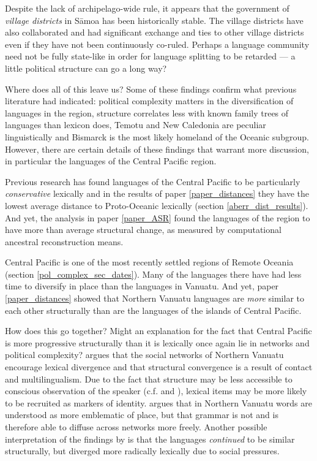 \documentclass[draft,10pt]{article} %
\begin{document}
Despite the lack of archipelago-wide rule, it appears that the government of \emph{village districts} in S\={a}moa has been historically stable. The village districts have also collaborated and had significant exchange and ties to other village districts even if they have not been continuously co-ruled. Perhaps a language community need not be fully state-like in order for language splitting to be retarded --- a little political structure can go a long way?

Where does all of this leave us? Some of these findings confirm what previous literature had indicated: political complexity matters in the diversification of languages in the region, structure correlates less with known family trees of languages than lexicon does, Temotu and New Caledonia are peculiar linguistically and Bismarck is the most likely homeland of the Oceanic subgroup. However, there are certain details of these findings that warrant more discussion, in particular the languages of the Central Pacific region.

Previous research has found languages of the Central Pacific to be particularly \emph{conservative} lexically \citep[323]{blust2000lexicostatistics} and in the results of paper \ref{paper_distances} they have the lowest average distance to Proto-Oceanic lexically (section \ref{aberr_dist_results}). And yet, the analysis in paper \ref{paper_ASR} found the languages of the region to have more than average structural change, as measured by computational ancestral reconstruction means. 

Central Pacific is one of the most recently settled regions of Remote Oceania (section \ref{pol_complex_sec_dates}). Many of the languages there have had less time to diversify in place than the languages in Vanuatu. And yet, paper \ref{paper_distances} showed that Northern Vanuatu languages are \emph{more} similar to each other structurally than are the languages of the islands of Central Pacific. 

How does this go together? Might an explanation for the fact that Central Pacific is more progressive structurally than it is lexically once again lie in networks and political complexity? \cite{francois2011} argues that the social networks of Northern Vanuatu encourage lexical divergence and that structural convergence is a result of contact and multilingualism. Due to the fact that structure may be less accessible to conscious observation of the speaker (c.f. \citet{silverstein1981limits} and \citet[237-238]{pawley2006explaining}), lexical items may be more likely to be recruited as markers of identity. \cite{francois2011} argues that in Northern Vanuatu words are understood as more emblematic of place, but that grammar is not and is therefore able to diffuse across networks more freely. Another possible interpretation of the findings by \cite{francois2011} is that the languages \emph{continued} to be similar structurally, but diverged more radically lexically due to social pressures.
\end{document}
